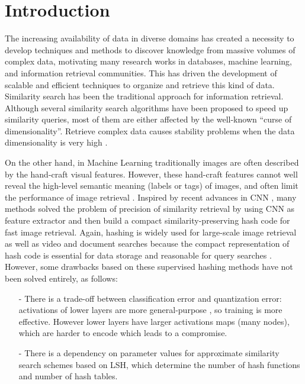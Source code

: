 \documentclass{article}
\begin{document}
\section{Introduction}\label{sec:intro}

The increasing availability of data in diverse domains has created a necessity to develop techniques and methods to discover knowledge from massive volumes of complex data, motivating many research works in databases, machine learning, and information retrieval communities.  This has driven the development of scalable and efficient techniques to organize and retrieve this kind of data. Similarity search has been the traditional approach for information retrieval.  Although several similarity search algorithms have been proposed to speed up similarity queries, most of them are either affected by the well-known ``curse of dimensionality''.  Retrieve  complex data causes   stability problems  when the data dimensionality is very high \cite{aleman_high_dimensional}.   
  
On the other hand, in Machine Learning traditionally images are often described by the hand-craft visual features.  However, these hand-craft features cannot well reveal the high-level semantic meaning (labels or tags) of images, and often limit the performance of image retrieval \cite{Li:2015:RSS:2881665.2882186}.   Inspired by recent advances in \acf{CNN}  \cite{ImageNet}, many methods solved the problem of precision of similarity retrieval by using CNN  as feature extractor and then  build a compact similarity-preserving hash code for fast image retrieval.   Again, hashing is widely used for large-scale image retrieval as well as video and document searches because the compact representation of hash code is essential for data storage and reasonable for query searches \cite{conf/cvpr/ShenSLS15}.  However, some drawbacks based  on these supervised hashing methods have not been solved entirely, as follows:
 

\begin{itemize}


 
\item[-]  There is a trade-off between classification error and quantization error: activations of lower layers are more general-purpose \cite{DBLP:journals/corr/YosinskiCBL14}, so training is more effective. However lower layers have larger  activations maps (many nodes), which are harder to encode which leads to a compromise.

 
\item[-]  There is a dependency on parameter values  for approximate similarity search schemes based on LSH, which determine the number of hash functions and number of hash tables.

\end{itemize}
\end{document}
